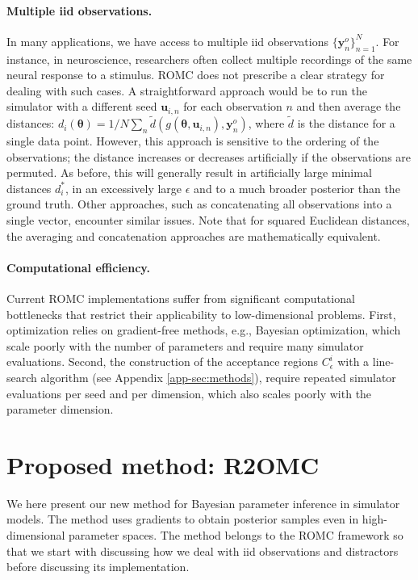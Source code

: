 \documentclass[twoside]{article}
\newcommand{\thb}{\boldsymbol{\theta}}
\newcommand{\ub}{\mathbf{u}}
\newcommand{\data}{\mathbf{y}^o}
\newcommand{\accregioni}{C_{\epsilon}^i}
\newcommand{\rromc}{R2OMC}
\begin{document}
\paragraph{Multiple iid observations.}

In many applications, we have access to multiple iid observations $\{\data_n\}_{n=1}^N$.
For instance, in neuroscience, researchers often collect multiple recordings of the same neural response to a stimulus.
ROMC does not prescribe a clear strategy for dealing with such cases.
A straightforward approach would be to run the simulator with a different seed $\ub_{i,n}$ for each observation $n$ and then average the distances: $d_i(\thb) = 1/N \sum_n \tilde{d}(g(\thb, \ub_{i,n}), \data_n)$, where $\tilde{d}$ is the distance for a single data point.
However, this approach is sensitive to the ordering of the observations;
the distance increases or decreases artificially if the observations are permuted.
As before, this will generally result in artificially large minimal distances $d_i^*$,
in an excessively large $\epsilon$ and to a much broader posterior than the ground truth.
Other approaches, such as concatenating all observations into a single vector, encounter similar issues.
Note that for squared Euclidean distances, the averaging and concatenation approaches are mathematically equivalent.

\paragraph{Computational efficiency.}

Current ROMC implementations \citep{gkolemis2023extendable} suffer from significant computational bottlenecks that restrict their applicability to low-dimensional problems.
First, optimization relies on gradient-free methods, e.g., Bayesian optimization, which scale poorly with the number of parameters and require many simulator evaluations.
Second, the construction of the acceptance regions $\accregioni$ with a line-search algorithm (see Appendix \ref{app-sec:methods}), require repeated simulator evaluations per seed and per dimension, which also scales poorly with the parameter dimension.

\section{Proposed method: \rromc}
\label{sec:rromc}

We here present our new method for Bayesian parameter inference in simulator models. The method uses gradients to obtain posterior samples even in high-dimensional parameter spaces. The method belongs to the ROMC framework so that we start with discussing how we deal with iid observations and distractors before discussing its implementation.
\end{document}
